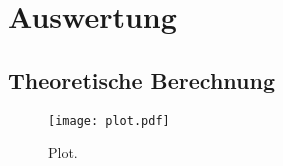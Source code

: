 \section{Auswertung}
\label{sec:Auswertung}
\subsection{Theoretische Berechnung}
\begin{figure}
  \centering
  \texttt{[image: plot.pdf]}
  \caption{Plot.}
  \label{fig:plot}
\end{figure}

